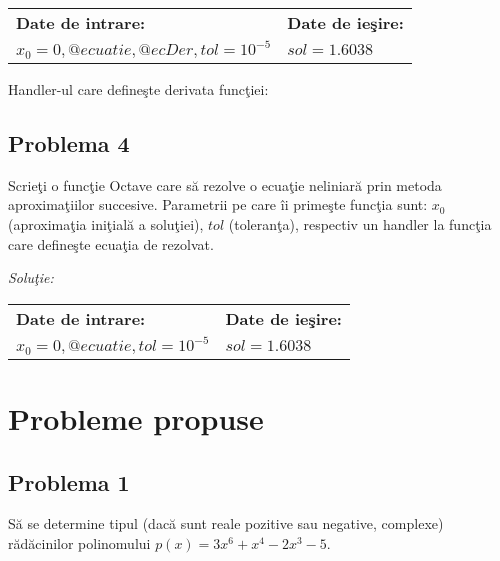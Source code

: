 \documentclass{exam}
\newcommand{\octavescript}[2]{
	
}
\begin{document}
\octavescript{./src/tangenta.m}{Metoda tangentei.}

\begin{center}
	\begin{tabular}{| l | l |}
		\hline
		\textbf{Date de intrare:}                    & \textbf{Date de ieşire:} \\
		$x_0 = 0, @ecuatie, @ecDer, tol = 10 ^ {-5}$ & $sol = 1.6038$           \\
		\hline
	\end{tabular}
\end{center}

Handler-ul care defineşte derivata funcţiei:

\octavescript{./src/ecDer.m}{Handler pentru derivata funcţiei.}

\subsection{Problema 4}
Scrieţi o funcţie Octave care să rezolve o ecuaţie neliniară  prin metoda aproximaţiilor succesive. Parametrii pe care îi primeşte funcţia sunt: $x_0$ (aproximaţia iniţială a soluţiei), $tol$ (toleranţa), respectiv un handler la funcţia care defineşte ecuaţia de rezolvat.

\textit{Soluţie:}

\octavescript{./src/aprox_succesive.m}{Metoda aproximaţiilor succesive.}

\begin{center}
	\begin{tabular}{| l | l |}
		\hline
		\textbf{Date de intrare:}            & \textbf{Date de ieşire:} \\
		$x_0 = 0, @ecuatie, tol = 10 ^ {-5}$ & $sol = 1.6038$           \\
		\hline
	\end{tabular}
\end{center}

\section{Probleme propuse}

\subsection{Problema 1}
Să se determine tipul (dacă sunt reale pozitive sau negative, complexe) rădăcinilor polinomului $p(x)=3x^{6}+x^{4}-2x^{3}-5$.
\end{document}
